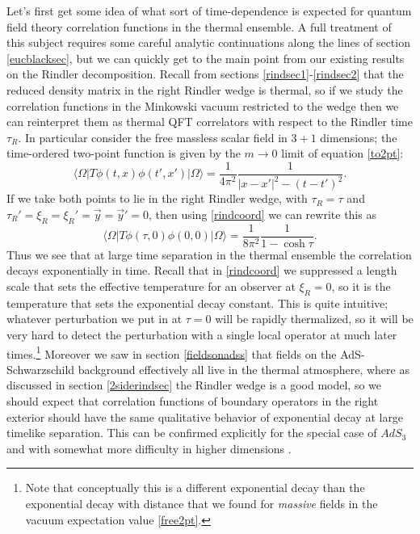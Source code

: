 \documentclass[12pt]{article}
\newcommand{\be}{\begin{equation}}
\newcommand{\ee}{\end{equation}}
\newcommand{\lan}{\langle}
\newcommand{\ran}{\rangle}
\begin{document}
Let's first get some idea of what sort of time-dependence is expected for quantum field theory correlation functions in the thermal ensemble.  A full treatment of this subject requires some careful analytic continuations along the lines of section \ref{eucblacksec}, but we can quickly get to the main point from our existing results on the Rindler decomposition.  Recall from sections \ref{rindsec1}-\ref{rindsec2} that the reduced density matrix in the right Rindler wedge is thermal, so if we study the correlation functions in the Minkowski vacuum restricted to the wedge then we can reinterpret them as thermal QFT correlators with respect to the Rindler time $\tau_R$.  In particular consider the free massless scalar field in $3+1$ dimensions; the time-ordered two-point function is given by the $m\to 0$ limit of equation \eqref{to2pt}:
\be
\lan \Omega |T \phi(t,x)\phi(t',x')|\Omega\ran=\frac{1}{4\pi^2}\frac{1}{|x-x'|^2-(t-t')^2}.
\ee
If we take both points to lie in the right Rindler wedge, with $\tau_R=\tau$ and $\tau_R'=\xi_R=\xi_R'=\vec{y}=\vec{y}'=0$, then using \eqref{rindcoord} we can rewrite this as
\be\label{expcorr}
\lan \Omega | T \phi(\tau,0)\phi(0,0)|\Omega\ran=\frac{1}{8\pi^2}\frac{1}{1-\cosh\tau}.
\ee
Thus we see that at large time separation in the thermal ensemble the correlation decays exponentially in time.  Recall that in \eqref{rindcoord} we suppressed a length scale that sets the effective temperature for an observer at $\xi_R=0$, so it is the temperature that sets the exponential decay constant.  This is quite intuitive; whatever perturbation we put in at $\tau=0$ will be rapidly thermalized, so it will be very hard to detect the perturbation with a single local operator at much later times.\footnote{Note that conceptually this is a different exponential decay than the exponential decay with distance that we found for \textit{massive} fields in the vacuum expectation value \eqref{free2pt}.}  Moreover we saw in section \ref{fieldsonadss} that fields on the AdS-Schwarzschild background effectively all live in the thermal atmosphere, where as discussed in section \ref{2siderindsec} the Rindler wedge is a good model, so we should expect that correlation functions of boundary operators in the right exterior should have the same qualitative behavior of exponential decay at large timelike separation. This can be confirmed explicitly for the special case of $AdS_3$ and with somewhat more difficulty in higher dimensions \cite{Maldacena:2001kr}. 
\end{document}
